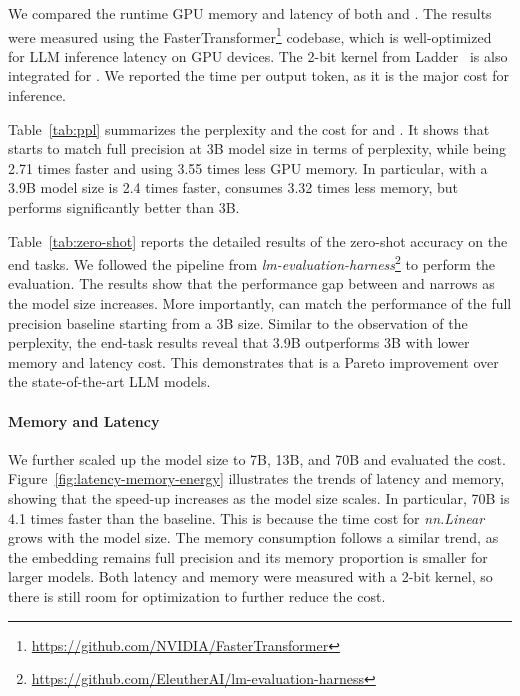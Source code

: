 We compared the runtime GPU memory and latency of both \llama{} and \our{}. The results were measured using the FasterTransformer\footnote{\url{https://github.com/NVIDIA/FasterTransformer}} codebase, which is well-optimized for LLM inference latency on GPU devices. The 2-bit kernel from Ladder~\cite{ladder} is also integrated for \our{}. We reported the time per output token, as it is the major cost for inference.

Table~\ref{tab:ppl} summarizes the perplexity and the cost for \our{} and \llama{}. It shows that \our{} starts to match full precision \llama{} at 3B model size in terms of perplexity, while being 2.71 times faster and using 3.55 times less GPU memory. In particular, \our{} with a 3.9B model size is 2.4 times faster, consumes 3.32 times less memory, but performs significantly better than \llama{} 3B. 

Table~\ref{tab:zero-shot} reports the detailed results of the zero-shot accuracy on the end tasks. We followed the pipeline from \emph{lm-evaluation-harness}\footnote{\url{https://github.com/EleutherAI/lm-evaluation-harness}} to perform the evaluation. The results show that the performance gap between \our{} and \llama{} narrows as the model size increases. More importantly, \our{} can match the performance of the full precision baseline starting from a 3B size. Similar to the observation of the perplexity, the end-task results reveal that \our{} 3.9B outperforms \llama{} 3B with lower memory and latency cost. This demonstrates that \our{} is a Pareto improvement over the state-of-the-art LLM models.



\paragraph{Memory and Latency}



We further scaled up the model size to 7B, 13B, and 70B and evaluated the cost. Figure~\ref{fig:latency-memory-energy} illustrates the trends of latency and memory, showing that the speed-up increases as the model size scales. In particular, \our{} 70B is 4.1 times faster than the \llama{} baseline. This is because the time cost for \emph{nn.Linear} grows with the model size. The memory consumption follows a similar trend, as the embedding remains full precision and its memory proportion is smaller for larger models. Both latency and memory were measured with a 2-bit kernel, so there is still room for optimization to further reduce the cost.

